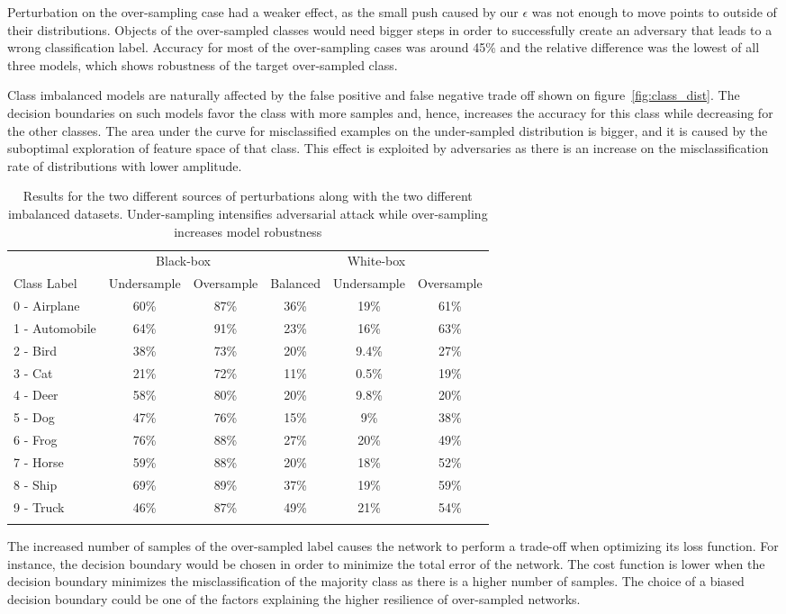 \documentclass[runningheads,a4paper]{llncs}
\begin{document}
Perturbation on the over-sampling case had a weaker effect, as the small push caused by our $\epsilon$ was not enough to move points to outside of their distributions. Objects of the over-sampled classes would need bigger steps in order to successfully create an adversary that leads to a wrong classification label. Accuracy for most of the over-sampling cases was around 45\% and the relative difference was the lowest of all three models, which shows robustness of the target over-sampled class. 


Class imbalanced models are naturally affected by the false positive and false negative trade off shown on figure~\ref{fig:class_dist}. The decision boundaries on such models favor the class with more samples and, hence, increases the accuracy for this class while decreasing for the other classes. The area under the curve for misclassified examples on the under-sampled distribution is bigger, and it is caused by the suboptimal exploration of feature space of that class. This effect is exploited by adversaries as there is an increase on the misclassification rate of distributions with lower amplitude.
\begin{table}
	\centering	
	\begin{tabular}{lccccc}
		\toprule
		&\multicolumn{2}{c}{Black-box}
		&\multicolumn{3}{c}{White-box}
		\\\cmidrule(r){2-3}\cmidrule(l){4-6}
		Class Label &Undersample &Oversample &Balanced &Undersample &Oversample \\
		\midrule
		0 - Airplane &60\%& 87\% &36\%& 19\%    & 61\% \\
		1 - Automobile &64\%& 91\% &23\%& 16\%    & 63\% \\
		2 - Bird &38\%& 73\% &20\%& 9.4\%    & 27\% \\
		3 - Cat &21\%& 72\% &11\%& 0.5\%    & 19\% \\
		4 - Deer &58\%& 80\% &20\%& 9.8\%    & 20\% \\
		5 - Dog &47\%& 76\% &15\%& 9\%    & 38\% \\
		6 - Frog &76\%& 88\% &27\%& 20\%    & 49\% \\
		7 - Horse &59\%& 88\% &20\%& 18\%    & 52\% \\
		8 - Ship &69\%& 89\% &37\%& 19\%    & 59\% \\
		9 - Truck &46\%& 87\% &49\%& 21\%    & 54\% \\
		\bottomrule
		\hfill
	\end{tabular}
	\caption{Results for the two different sources of perturbations along with the two different imbalanced datasets. Under-sampling intensifies adversarial attack while over-sampling increases model robustness}
	\label{tbl:results}
\end{table}
The increased number of samples of the over-sampled label causes the network to perform a trade-off when optimizing its loss function. For instance, the decision boundary would be chosen in order to minimize the total error of the network. The cost function is lower when the decision boundary minimizes the misclassification of the majority class as there is a higher number of samples. The choice of a biased decision boundary could be one of the factors explaining the higher resilience of over-sampled networks.
\end{document}
